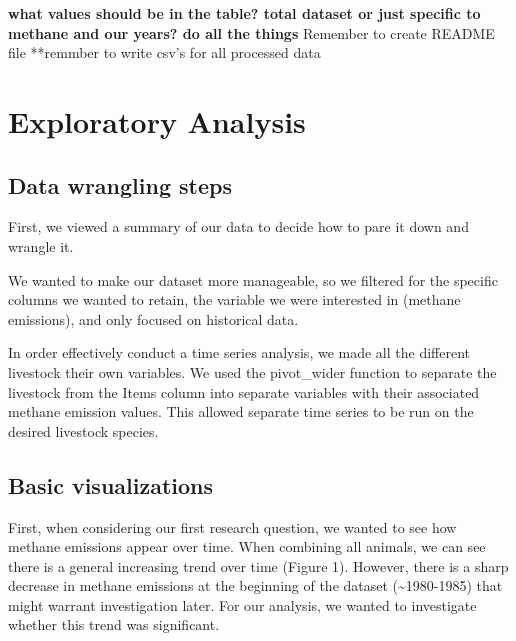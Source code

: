 \documentclass[
  12pt,
]{article}
\begin{document}
\textbf{what values should be in the table? total dataset or just
specific to methane and our years? do all the things }Remember to create
README file **remmber to write csv's for all processed data

\newpage

\hypertarget{exploratory-analysis}{%
\section{Exploratory Analysis}\label{exploratory-analysis}}

\hypertarget{data-wrangling-steps}{%
\subsection{Data wrangling steps}\label{data-wrangling-steps}}

First, we viewed a summary of our data to decide how to pare it down and
wrangle it.

We wanted to make our dataset more manageable, so we filtered for the
specific columns we wanted to retain, the variable we were interested in
(methane emissions), and only focused on historical data.

In order effectively conduct a time series analysis, we made all the
different livestock their own variables. We used the pivot\_wider
function to separate the livestock from the Items column into separate
variables with their associated methane emission values. This allowed
separate time series to be run on the desired livestock species.

\hypertarget{basic-visualizations}{%
\subsection{Basic visualizations}\label{basic-visualizations}}

First, when considering our first research question, we wanted to see
how methane emissions appear over time. When combining all animals, we
can see there is a general increasing trend over time (Figure 1).
However, there is a sharp decrease in methane emissions at the beginning
of the dataset (\textasciitilde1980-1985) that might warrant
investigation later. For our analysis, we wanted to investigate whether
this trend was significant.
\end{document}
